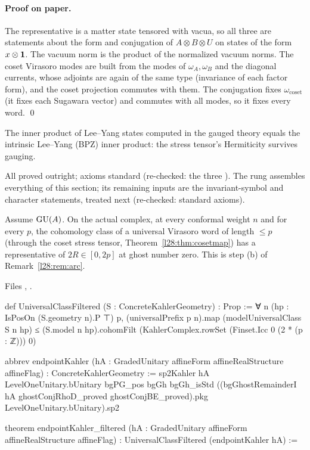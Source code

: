 \paragraph{Proof on paper.} The representative is a matter state tensored with vacua, so all three are statements about the form and conjugation of
$A\otimes B\otimes U$ on states of the form $x\otimes\mathbf 1$. The vacuum norm is the product of the normalized vacuum norms. The coset
Virasoro modes are built from the modes of $\omega_A,\omega_B$ and the diagonal currents, whose adjoints are again of the same type
(invariance of each factor form), and the coset projection commutes with them. The conjugation fixes $\omega_{\mathrm{coset}}$ (it fixes each
Sugawara vector) and commutes with all modes, so it fixes every word. \qed

\begin{physics}
The inner product of Lee--Yang states computed in the gauged theory equals the intrinsic Lee--Yang (BPZ) inner product: the stress tensor's
Hermiticity survives gauging.
\end{physics}

\begin{status}
All proved outright; axioms standard (re-checked: the three ). The rung 
assembles everything of this section; its remaining inputs are the invariant-symbol and character statements, treated next (re-checked:
standard axioms).
\end{status}

\begin{theorem}\label{l28:thm:filtered}
Assume $\mathrm{GU}(A)$. On the actual complex, at every conformal weight $n$ and for every $p$, the cohomology class of a universal
Virasoro word of length $\le p$ (through the coset stress tensor, Theorem~\ref{l28:thm:cosetmap}) has a representative of $2R\in[0,2p]$ at
ghost number zero. This is step (b) of Remark~\ref{l28:rem:arc}.
\end{theorem}

\noindent Files , .
\begin{leancode}
def UniversalClassFiltered (S : ConcreteKahlerGeometry) : Prop :=
  ∀ n (hp : IsPosOn (S.geometry n).P ⊤) p,
    (universalPrefix p n).map (modelUniversalClass S n hp) ≤
      (S.model n hp).cohomFilt (KahlerComplex.rowSet (Finset.Icc 0 (2 * (p : ℤ))) 0)

abbrev endpointKahler (hA : GradedUnitary affineForm affineRealStructure affineFlag) :
    ConcreteKahlerGeometry :=
  sp2Kahler hA LevelOneUnitary.bUnitary bgPG_pos bgGh bgGh_isStd
    ((bgGhostRemainderI hA ghostConjRhoD_proved ghostConjBE_proved).pkg
      LevelOneUnitary.bUnitary).sp2

theorem endpointKahler_filtered (hA : GradedUnitary affineForm affineRealStructure affineFlag) :
    UniversalClassFiltered (endpointKahler hA) :=
\end{leancode}

